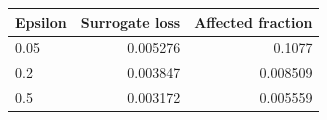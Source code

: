 \begin{center}\small
\begin{tabular}{lrr}
\toprule
Epsilon & Surrogate loss & Affected fraction \\
\midrule
0.05 & 0.005276 & 0.1077 \\
0.2 & 0.003847 & 0.008509 \\
0.5 & 0.003172 & 0.005559 \\
\bottomrule
\end{tabular}
\end{center}
